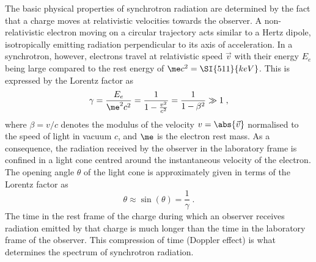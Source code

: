 \documentclass[
twoside,
openright,
titlepage,
numbers=noenddot,
headinclude,
fleqn,
a4paper,
footinclude=true,
cleardoublepage=empty,
abstractoff,
BCOR=5mm,
paper=a4,
fontsize=11pt,
british,ngerman,american,
]{scrreprt}
\begin{document}
The basic physical properties of synchrotron radiation are determined
by the fact that a charge moves at relativistic velocities towards the
observer.  A non-relativistic electron moving on a circular trajectory
acts similar to a Hertz dipole, isotropically emitting radiation
perpendicular to its axis of acceleration.  In a synchrotron, however,
electrons travel at relativistic speed $\vec{v}$ with their energy
$E_e$ being large compared to the rest energy of $\me
c^2=\SI{511}{keV}$.  This is expressed by the Lorentz factor as
\begin{equation}
  \label{eq:gamma}
  \gamma =\frac{E_e}{\me^2c^2} 
  =\frac{1}{1-\frac{v^2}{c^2}}=\frac{1}{1-\beta^2}\gg1\;,
\end{equation}
where $\beta=v/c$ denotes the modulus of the velocity
$v=\abs{\vec{v}}$ normalised to the speed of light in vacuum $c$, and
$\me$ is the electron rest mass.  As a consequence, the radiation
received by the observer in the laboratory frame is confined in a
light cone centred around the instantaneous velocity of the electron.
The opening angle $\theta$ of the light cone is approximately given
in terms of the Lorentz factor as \cite{Hofmann2004Book}
\begin{equation}
  \label{eq:angle}
  \theta \approx \sin(\theta) = \frac{1}{\gamma}\;.
\end{equation}
The time in the rest frame of the charge during which an observer
receives radiation emitted by that charge is much longer than the time
in the laboratory frame of the observer.  This compression of time
(Doppler effect) is what determines the spectrum of synchrotron
radiation.
\end{document}
